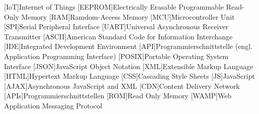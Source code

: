 \begin{acronym}[xxxxxxxxx]
  [IoT]{Internet of Things}
  [EEPROM]{Electrically Erasable Programmable Read-Only Memory}
  [RAM]{Ramdom-Access Memory}
  [MCU]{Microcontroller Unit}
  [SPI]{Serial Peripheral Interface}
  [UART]{Universal Asynchronous Receiver Transmitter}
  [ASCII]{American Standard Code for Information Interchange}
  [IDE]{Integrated Development Environment}
  [API]{Programmierschnittstelle (engl. Application Programming Interface)}
  [POSIX]{Portable Operating System Interface}
  [JSON]{JavaScript Object Notation}
  [XML]{Extensible Markup Language}
  [HTML]{Hypertext Markup Language}
  [CSS]{Cascading Style Sheets}
  [JS]{JavaScript}
  [AJAX]{Asynchronous JavaScript and XML}
  [CDN]{Content Delivery Network}
  [APIs]{Programmierschnittstellen}
  [ROM]{Read Only Memory}
  [WAMP]{Web Application Messaging Protocol}
  
\end{acronym}

